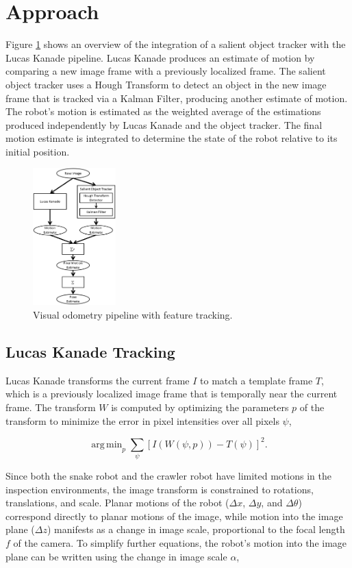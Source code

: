 \documentclass[letterpaper, 10 pt, conference]{ieeeconf}
\DeclareMathOperator*{\argmin}{arg\,min}
\begin{document}
\section{Approach}

Figure \ref{approach} shows an overview of the integration of a salient object tracker with the Lucas Kanade pipeline. Lucas Kanade produces an estimate of motion by comparing a new image frame with a previously localized frame. The salient object tracker uses a Hough Transform to detect an object in the new image frame that is tracked via a Kalman Filter, producing another estimate of motion. The robot's motion is estimated as the weighted average of the estimations produced independently by Lucas Kanade and the object tracker. The final motion estimate is integrated to determine the state of the robot relative to its initial position.

\begin{figure}[tb]
	\centering
	\includegraphics[height=200px]{approach_overview.png}
	\caption{Visual odometry pipeline with feature tracking.}
    \label{approach}
\end{figure}

\subsection{Lucas Kanade Tracking}

Lucas Kanade transforms the current frame $I$ to match a template frame $T$, which is a previously localized image frame that is temporally near the current frame. The transform $W$ is computed by optimizing the parameters $p$ of the transform to minimize the error in pixel intensities over all pixels $\psi$,

\begin{equation} \label{eq:lkt_min}
    \argmin_p \sum_{\psi} [I(W(\psi, p)) - T(\psi)]^2.
\end{equation}

Since both the snake robot and the crawler robot have limited motions in the inspection environments, the image transform is constrained to rotations, translations, and scale. Planar motions of the robot ($\Delta x$, $\Delta y$, and $\Delta \theta$) correspond directly to planar motions of the image, while motion into the image plane ($\Delta z$) manifests as a change in image scale, proportional to the focal length $f$ of the camera. To simplify further equations, the robot's motion into the image plane can be written using the change in image scale $\alpha$,
\end{document}
